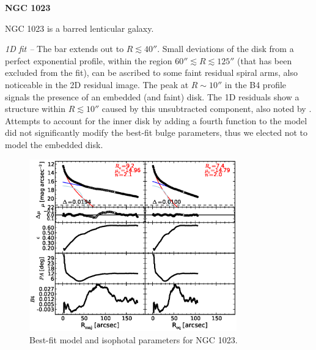 \documentclass[preprint2]{emulateapj}
\newcommand{\fitfigurewidth}{0.8\textwidth}
\begin{document}
  \clearpage\newpage\noindent
  {\bf NGC 1023 \\}

  NGC 1023 is a barred lenticular galaxy. %

  \emph{1D fit -- }
  The bar extends out to $R \lesssim 40''$.
  Small deviations of the disk from a perfect exponential profile, 
  within the region $60'' \lesssim R \lesssim 125''$ (that has been excluded from the fit), 
  can be ascribed to some faint residual spiral arms, also noticeable in the 2D residual image. 
  The peak at $R \sim 10''$ in the B4 profile signals the presence of an embedded (and faint) disk.
  The 1D residuals show a structure within $R \lesssim 10''$ caused by this unsubtracted 
  component, also noted by \cite{lasker2014data}.
  Attempts to account for the inner disk by adding a fourth function to the model 
  did not significantly modify the best-fit bulge parameters,
  thus we elected not to model the embedded disk.

  \begin{figure}[h]
  \begin{center}
  \includegraphics[width=\fitfigurewidth]{images/n1023_1Dfit.eps}
  \caption{Best-fit model and isophotal parameters for NGC 1023.}
  \end{center}
  \end{figure}
\end{document}
